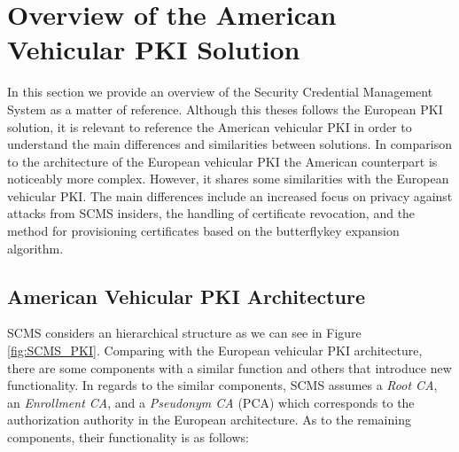 \section{Overview of the American Vehicular PKI Solution} \label{us_pki}
In this section we provide an overview of the Security Credential Management System as a matter of reference. Although this theses follows the European PKI solution, it is relevant to reference the American vehicular PKI in order to understand the main differences and similarities between solutions.
In comparison to the architecture of the European vehicular PKI the American counterpart is noticeably more complex. However, it shares some similarities with the European vehicular PKI. The main differences include an increased focus on privacy against attacks from SCMS insiders, the handling of certificate revocation, and the method for provisioning certificates based on the butterflykey expansion algorithm. 

\subsection{American Vehicular PKI Architecture}
\bigbreak
SCMS considers an hierarchical structure as we can see in Figure \ref{fig:SCMS_PKI}. Comparing with the European vehicular PKI architecture, there are some components with a similar function and others that introduce new functionality. In regards to the similar components, SCMS assumes a \textit{Root CA}, an \textit{Enrollment CA}, and a \textit{Pseudonym CA} (PCA) which corresponds to the authorization authority in the European architecture. As to the remaining components, their functionality is as follows:

